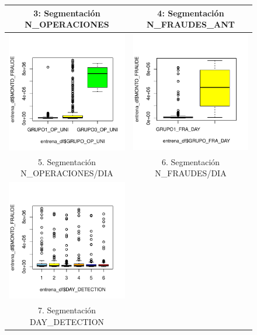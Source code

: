 \documentclass[
	11pt, %
	spanish, %
]{fphw}
\begin{document}
\begin{figure}[h!]
\begin{tabular}{| p{6cm} | p{6cm} |}
\multicolumn{1}{|c|}{\small 3: Segmentación N\_OPERACIONES} & \multicolumn{1}{c|}{\small 4: Segmentación N\_FRAUDES\_ANT} \\ \hline
\vspace{2mm} \includegraphics[width=55mm]{box5} & \vspace{2mm} \includegraphics[width=55mm]{box6} \\ 
\multicolumn{1}{|c|}{\small 5. Segmentación N\_OPERACIONES/DIA} & \multicolumn{1}{c|}{\small 6. Segmentación N\_FRAUDES/DIA } \\ \hline
\vspace{2mm} \includegraphics[width=55mm]{box7} & \\ 
\multicolumn{1}{|c|}{\small 7. Segmentación DAY\_DETECTION} &  \\
\hline 
\end{tabular}
\label{boxplot7}
\end{figure}
\end{document}

